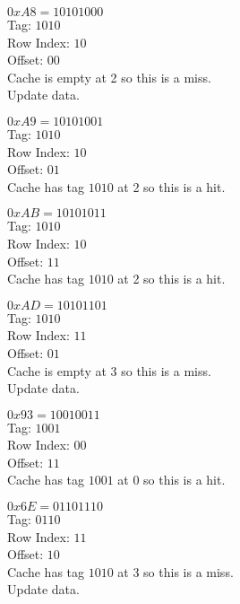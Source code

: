 \documentclass{article}
\begin{document}
{     $0xA8 = 1010 1000$ \\
     Tag: $1010$ \\
     Row Index: $10$ \\
     Offset: $00$ \\
     Cache is empty at 2 so this is a miss. \\
     Update data. \\
     \linebreak

     $0xA9 = 1010 1001$ \\
     Tag: $1010$ \\
     Row Index: $10$ \\
     Offset: $01$ \\
     Cache has tag $1010$ at 2 so this is a hit. \\
     \linebreak

     $0xAB = 1010 1011$ \\
     Tag: $1010$ \\
     Row Index: $10$ \\
     Offset: $11$ \\
     Cache has tag $1010$ at 2 so this is a hit. \\
     \linebreak

     $0xAD = 1010 1101$ \\
     Tag: $1010$ \\
     Row Index: $11$ \\
     Offset: $01$ \\
     Cache is empty at 3 so this is a miss. \\
     Update data. \\
     \linebreak

     $0x93 = 1001 0011$ \\
     Tag: $1001$ \\
     Row Index: $00$ \\
     Offset: $11$ \\
     Cache has tag $1001$ at 0 so this is a hit. \\
     \linebreak

     $0x6E = 0110 1110$ \\
     Tag: $0110$ \\
     Row Index: $11$ \\
     Offset: $10$ \\
     Cache has tag $1010$ at 3 so this is a miss. \\
     Update data. \\
     \linebreak

}
\end{document}
